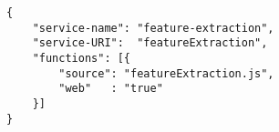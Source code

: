 

\begin{lstlisting}[caption=Feature extraction service descriptor, label=lst:ms_criteria, captionpos=t]
{
	"service-name":	"feature-extraction",
	"service-URI": 	"featureExtraction",
	"functions": [{	
		"source": "featureExtraction.js",
		"web"	: "true" 
	}]
}
\end{lstlisting}


